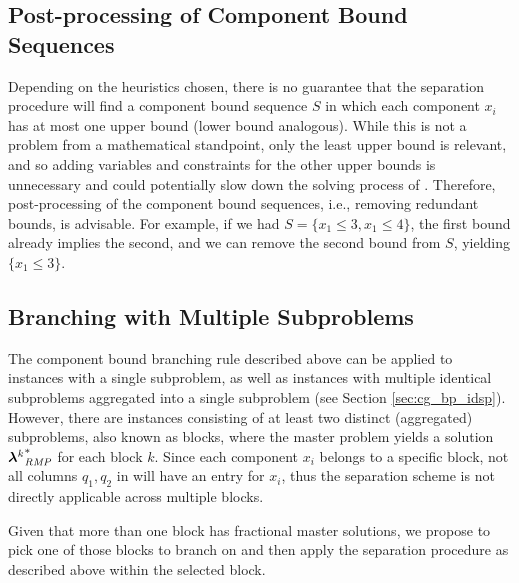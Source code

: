 \subsection{Post-processing of Component Bound Sequences}\label{sec:cmpbnd_separation_postprocessing}
Depending on the heuristics chosen, there is no guarantee that the separation procedure will find a component bound sequence $S$ in which each component $x_i$ has at most one upper bound (lower bound analogous). While this is not a problem from a mathematical standpoint, only the least upper bound is relevant, and so adding variables and constraints for the other upper bounds is unnecessary and could potentially slow down the solving process of \SP{}. Therefore, post-processing of the component bound sequences, i.e., removing redundant bounds, is advisable. For example, if we had $S = \{x_1 \leq 3, x_1 \leq 4\}$, the first bound already implies the second, and we can remove the second bound from $S$, yielding $\{x_1 \leq 3\}$.

\subsection{Branching with Multiple Subproblems}\label{sec:cmpbnd_separation_branching}
The component bound branching rule described above can be applied to instances with a single subproblem, as well as instances with multiple identical subproblems aggregated into a single subproblem (see Section \ref{sec:cg_bp_idsp}). However, there are instances consisting of at least two distinct (aggregated) subproblems, also known as blocks, where the master problem yields a solution ${{\bm{\lambda}}^k}^*_{\textit{RMP}}{}$ for each block $k$. Since each component $x_i$ belongs to a specific block, not all columns $q_1, q_2$ in \RMP{} will have an entry for $x_i$, thus the separation scheme is not directly applicable across multiple blocks.

Given that more than one block has fractional master solutions, we propose to pick one of those blocks to branch on and then apply the separation procedure as described above within the selected block.
